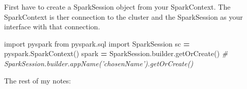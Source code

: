 \documentclass[]{book}
\newenvironment{Shaded}{\begin{snugshade}}{\end{snugshade}}
\newcommand{\ImportTok}[1]{#1}
\newcommand{\CommentTok}[1]{\textcolor[rgb]{0.56,0.35,0.01}{\textit{#1}}}
\newcommand{\OperatorTok}[1]{\textcolor[rgb]{0.81,0.36,0.00}{\textbf{#1}}}
\newcommand{\NormalTok}[1]{#1}
\begin{document}
First have to create a SparkSession object from your SparkContext. The
SparkContext is ther connection to the cluster and the SparkSession as
your interface with that connection.

\begin{Shaded}
\begin{Highlighting}[]
\ImportTok{import}\NormalTok{ pyspark}
\ImportTok{from}\NormalTok{ pyspark.sql }\ImportTok{import}\NormalTok{ SparkSession}
\NormalTok{sc }\OperatorTok{=}\NormalTok{ pyspark.SparkContext()}
\NormalTok{spark }\OperatorTok{=}\NormalTok{ SparkSession.builder.getOrCreate() }\CommentTok{# SparkSession.builder.appName('chosenName').getOrCreate()}
\end{Highlighting}
\end{Shaded}

The rest of my notes:
\end{document}
